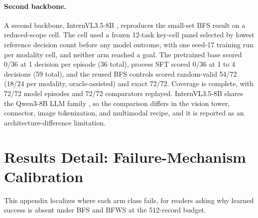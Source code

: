 \paragraph{Second backbone.} A second backbone, InternVL3.5-8B \citep{wang2025internvl35}, reproduces the small-set BFS result on a reduced-scope cell. The cell used a frozen 12-task key-cell panel selected by lowest reference decision count before any model outcome, with one seed-17 training run per modality cell, and neither arm reached a goal. The pretrained base scored 0/36 at 1 decision per episode (36 total), process SFT scored 0/36 at 1 to 4 decisions (59 total), and the reused BFS controls scored random-valid 54/72 (18/24 per modality, oracle-assisted) and exact 72/72. Coverage is complete, with 72/72 model episodes and 72/72 comparators replayed. InternVL3.5-8B shares the Qwen3-8B LLM family \citep{yang2025qwen3}, so the comparison differs in the vision tower, connector, image tokenization, and multimodal recipe, and it is reported as an architecture-difference limitation.

\section{Results Detail: Failure-Mechanism Calibration}
\label{app:results-failures}
\label{sec:results-failures}

This appendix localizes where each arm class fails, for readers asking why learned success is absent under BFS and BFWS at the 512-record budget.

